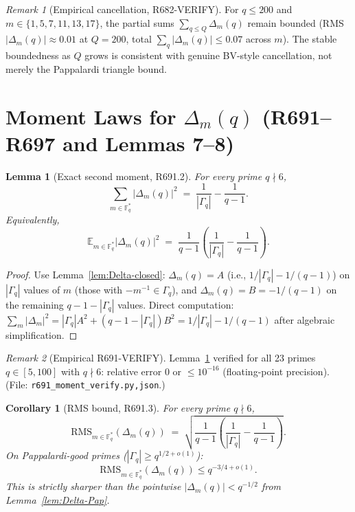 \documentclass[12pt]{amsart}
\newtheorem{lemma}{Lemma}
\newtheorem{corollary}{Corollary}
\theoremstyle{definition}
\theoremstyle{remark}
\newtheorem{remark}{Remark}
\begin{document}
\begin{remark}[Empirical cancellation, R682-VERIFY]
For $q \le 200$ and $m \in \{1, 5, 7, 11, 13, 17\}$, the partial sums
$\sum_{q \le Q} \Delta_m(q)$ remain bounded (RMS $|\Delta_m(q)| \approx 0.01$ at $Q = 200$,
total $\sum_q |\Delta_m(q)| \le 0.07$ across $m$). The stable boundedness as $Q$ grows is
consistent with genuine BV-style cancellation, not merely the Pappalardi triangle bound.
\end{remark}

\section{Moment Laws for $\Delta_m(q)$ (R691--R697 and Lemmas 7--8)}

\begin{lemma}[Exact second moment, R691.2]\label{lem:R691-2}
For every prime $q \nmid 6$,
$$
\sum_{m \in \mathbb{F}_q^*} |\Delta_m(q)|^2
\;=\;
\frac{1}{|\Gamma_q|} - \frac{1}{q - 1}.
$$
Equivalently,
$$
\mathbb{E}_{m \in \mathbb{F}_q^*} |\Delta_m(q)|^2
\;=\;
\frac{1}{q-1} \left( \frac{1}{|\Gamma_q|} - \frac{1}{q-1} \right).
$$
\end{lemma}

\begin{proof}
Use Lemma~\ref{lem:Delta-closed}: $\Delta_m(q) = A$ (i.e., $1/|\Gamma_q| - 1/(q-1)$) on $|\Gamma_q|$ values of $m$ (those with $-m^{-1} \in \Gamma_q$), and $\Delta_m(q) = B = -1/(q-1)$ on the remaining $q - 1 - |\Gamma_q|$ values. Direct computation:
$\sum_m |\Delta_m|^2 = |\Gamma_q| A^2 + (q-1-|\Gamma_q|) B^2 = 1/|\Gamma_q| - 1/(q-1)$
after algebraic simplification.
\end{proof}

\begin{remark}[Empirical R691-VERIFY]
Lemma~\ref{lem:R691-2} verified for all 23 primes $q \in [5, 100]$ with $q \nmid 6$:
relative error $0$ or $\le 10^{-16}$ (floating-point precision). \hfill(File: \texttt{r691\_moment\_verify.{py,json}}.)
\end{remark}

\begin{corollary}[RMS bound, R691.3]\label{cor:RMS-bound}
For every prime $q \nmid 6$,
$$
\mathrm{RMS}_{m \in \mathbb{F}_q^*}(\Delta_m(q))
\;=\;
\sqrt{ \frac{1}{q-1} \left( \frac{1}{|\Gamma_q|} - \frac{1}{q-1} \right) }.
$$
On Pappalardi-good primes ($|\Gamma_q| \ge q^{1/2 + o(1)}$):
$$
\mathrm{RMS}_{m \in \mathbb{F}_q^*}(\Delta_m(q)) \le q^{-3/4 + o(1)}.
$$
This is strictly sharper than the pointwise $|\Delta_m(q)| < q^{-1/2}$ from Lemma~\ref{lem:Delta-Pap}.
\end{corollary}
\end{document}
